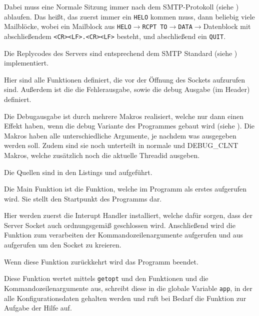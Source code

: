 Dabei muss eine Normale Sitzung immer nach dem SMTP-Protokoll (siehe ) ablaufen. Das heißt, das zuerst immer ein \texttt{HELO} kommen muss, dann beliebig viele Mailbl\"{o}cke, wobei ein Mailblock aus \texttt{HELO}$\rightarrow$\texttt{RCPT TO}$\rightarrow$\texttt{DATA}$\rightarrow$Datenblock mit abschließendem \texttt{<CR><LF>.<CR><LF>} besteht, und abschließend ein \texttt{QUIT}.

Die Replycodes des Servers sind entsprechend dem SMTP Standard (siehe ) implementiert.

\label{mod:smtprelay}
Hier sind alle Funktionen definiert, die vor der \"{O}ffnung des Sockets aufzurufen sind. Außerdem ist die die Fehlerausgabe, sowie die debug Ausgabe (im Header) definiert. 

Die Debugausgabe ist durch mehrere Makros realisiert, welche nur dann einen Effekt haben, wenn die debug Variante des Programmes gebaut wird (siehe ). Die Makros haben alle unterschiedliche Argumente, je nachdem was ausgegeben werden soll. Zudem sind sie noch unterteilt in normale und DEBUG\_CLNT Makros, welche zus\"{a}tzlich noch die aktuelle Threadid ausgeben.

Die Quellen sind in den Listings  und  aufgef\"{u}hrt.

\label{fn:main}
Die Main Funktion ist die Funktion, welche im Programm als erstes aufgerufen wird. Sie stellt den Startpunkt des Programms dar.

Hier werden zuerst die Interupt Handler installiert, welche daf\"{u}r sorgen, dass der Server Socket auch ordnungsgem\"{a}ß geschlossen wird. Anschließend wird die Funktion  zum verarbeiten der Kommandozeilenargumente aufgerufen und  aus  aufgerufen um den Socket zu kreieren.

Wenn diese Funktion zur\"{u}ckkehrt wird das Programm beendet.

\label{fn:process_opt}
Diese Funktion wertet mittels \texttt{getopt} und den Funktionen  und  die Kommandozeilenargumente aus, schreibt diese in die globale Variable \texttt{app}, in der alle Konfigurationsdaten gehalten werden und ruft bei Bedarf die Funktion zur Aufgabe der Hilfe  auf.

